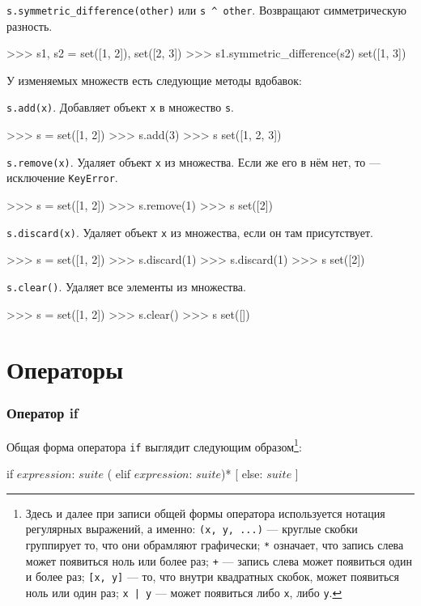 \lstinline{s.symmetric_difference(other)} или \lstinline{s ^ other}. Возвращают симметрическую разность.
\begin{pylst}{}{}
>>> s1, s2 = set([1, 2]), set([2, 3])
>>> s1.symmetric_difference(s2)
set([1, 3])
\end{pylst}

У изменяемых множеств есть следующие методы вдобавок:

\lstinline{s.add(x)}. Добавляет объект \lstinline{x} в множество \lstinline{s}.
\begin{pylst}{}{}
>>> s = set([1, 2])
>>> s.add(3)
>>> s
set([1, 2, 3])
\end{pylst}

\lstinline{s.remove(x)}. Удаляет объект \lstinline{x} из множества. Если же его в нём нет, то — исключение \lstinline{KeyError}.
\begin{pylst}{}{}
>>> s = set([1, 2])
>>> s.remove(1)
>>> s
set([2])
\end{pylst}

\lstinline{s.discard(x)}. Удаляет объект \lstinline{x} из множества, если он там присутствует.
\begin{pylst}{}{}
>>> s = set([1, 2])
>>> s.discard(1)
>>> s.discard(1)
>>> s
set([2])
\end{pylst}

\lstinline{s.clear()}. Удаляет все элементы из множества.
\begin{pylst}{}{}
>>> s = set([1, 2])
>>> s.clear()
>>> s
set([])
\end{pylst}

\section{Операторы}
\label{sec:py-statements}

\subsubsection{Оператор if}
Общая форма оператора \lstinline{if} выглядит следующим образом\footnote{Здесь и далее при записи общей формы оператора используется нотация регулярных выражений, а именно: \lstinline{(x, y, ...)} — круглые скобки группирует то, что они обрамляют графически; \lstinline{*} означает, что запись слева может появиться ноль или более раз; \lstinline{+} — запись слева может появиться один и более раз; \lstinline{[x, y]} — то, что внутри квадратных скобок, может появиться ноль или один раз; \lstinline{x | y} — может появиться либо \lstinline{x}, либо \lstinline{y}.}:
\begin{pylst}{}{}
if $expression$: $suite$
( elif $expression$: $suite$)*
[ else: $suite$ ]
\end{pylst}

